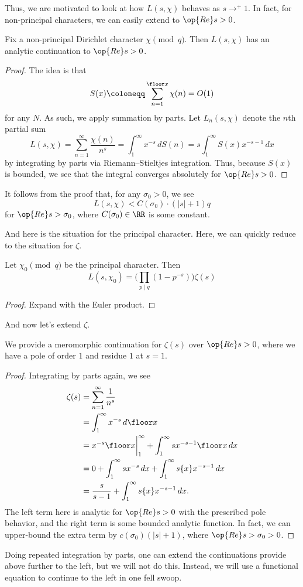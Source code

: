 \documentclass[../notes.tex]{subfiles}
\begin{document}
Thus, we are motivated to look at how $L(s,\chi)$ behaves as $s\to^+1$. In fact, for non-principal characters, we can easily extend to $\op{Re}s>0$.
\begin{proposition}
	Fix a non-principal Dirichlet character $\chi\pmod q$. Then $L(s,\chi)$ has an analytic continuation to $\op{Re}s>0$.
\end{proposition}
\begin{proof}
	The idea is that
	\[S(x)\coloneqq\sum_{n=1}^{\floor x}\chi(n)=O(1)\]
	for any $N$. As such, we apply summation by parts. Let $L_n(s,\chi)$ denote the $n$th partial sum
	\[L(s,\chi)=\sum_{n=1}^\infty\frac{\chi(n)}{n^s}=\int_1^\infty x^{-s}\,dS(n)=s\int_1^\infty S(x)x^{-s-1}\,dx\]
	by integrating by parts via Riemann--Stieltjes integration. Thus, because $S(x)$ is bounded, we see that the integral converges absolutely for $\op{Re}s>0$.
\end{proof}
\begin{remark}
	It follows from the proof that, for any $\sigma_0>0$, we see
	\[L(s,\chi)<C(\sigma_0)\cdot(|s|+1)q\]
	for $\op{Re}s>\sigma_0$, where $C(\sigma_0)\in\RR$ is some constant.
\end{remark}
And here is the situation for the principal character. Here, we can quickly reduce to the situation for $\zeta$.
\begin{proposition} \label{prop:principal-character}
	Let $\chi_0\pmod q$ be the principal character. Then
	\[L(s,\chi_0)=\Bigg(\prod_{p\mid q}\left(1-p^{-s}\right)\Bigg)\zeta(s)\]
\end{proposition}
\begin{proof}
	Expand with the Euler product.
\end{proof}
And now let's extend $\zeta$.
\begin{proposition}
	We provide a meromorphic continuation for $\zeta(s)$ over $\op{Re}s>0$, where we have a pole of order $1$ and residue $1$ at $s=1$.
\end{proposition}
\begin{proof}
	Integrating by parts again, we see
	\begin{align*}
		\zeta(s) &= \sum_{n=1}^\infty\frac1{n^s} \\
		&= \int_1^\infty x^{-s}\,d\floor x \\
		&= x^{-s}\floor x\bigg|_1^\infty+\int_1^\infty sx^{-s-1}\floor x\,dx \\
		&= 0+\int_1^\infty sx^{-s}\,dx+\int_1^\infty s\{x\}x^{-s-1}\,dx \\
		&= \frac s{s-1}+\int_1^\infty s\{x\}x^{-s-1}\,dx.
	\end{align*}
	The left term here is analytic for $\op{Re}s>0$ with the prescribed pole behavior, and the right term is some bounded analytic function. In fact, we can upper-bound the extra term by $c(\sigma_0)(|s|+1)$, where $\op{Re}s>\sigma_0>0$.
\end{proof}
\begin{remark}
	Doing repeated integration by parts, one can extend the continuations provide above further to the left, but we will not do this. Instead, we will use a functional equation to continue to the left in one fell swoop.
\end{remark}
\end{document}
